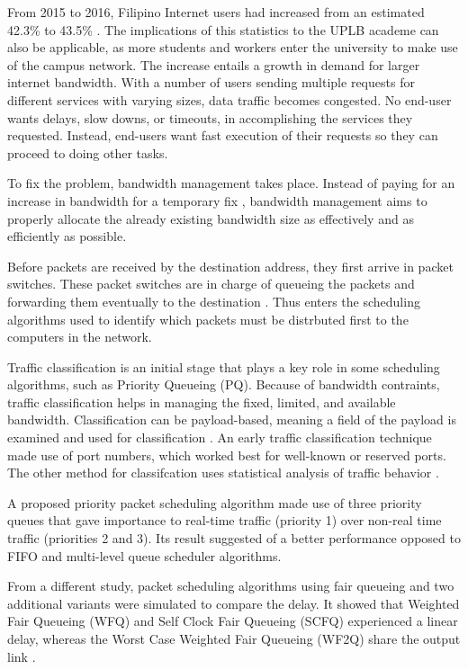 \documentclass[journal]{IEEE/IEEEtran}
\begin{document}
From 2015 to 2016, Filipino Internet users had increased from an estimated 42.3\% to 43.5\% \cite{internet_live_stats_2016}. The implications of this statistics to the UPLB academe can also be applicable, as more students and workers enter the university to make use of the campus network. The increase entails a growth in demand for larger internet bandwidth. With a number of users sending multiple requests for different services with varying sizes, data traffic becomes congested. No end-user wants delays, slow downs, or timeouts, in accomplishing the services they requested. Instead, end-users want fast execution of their requests so they can proceed to doing other tasks.

To fix the problem, bandwidth management takes place. Instead of paying for an increase in bandwidth for a temporary fix \cite{communication_news_2001}, bandwidth management aims to properly allocate the already existing bandwidth size as effectively and as efficiently as possible.

Before packets are received by the destination address, they first arrive in packet switches. These packet switches are in charge of queueing the packets and forwarding them eventually to the destination \cite{comer_1999}. Thus enters the scheduling algorithms used to identify which packets must be distrbuted first to the computers in the network.

Traffic classification is an initial stage that plays a key role in some scheduling algorithms, such as Priority Queueing (PQ). Because of bandwidth contraints, traffic classification helps in managing the fixed, limited, and available bandwidth. Classification can be payload-based, meaning a field of the payload is examined and used for classification \cite[Chapter~5]{cisco_2008}. An early traffic classification technique \cite{schneider_1996} made use of port numbers, which worked best for well-known or reserved ports. The other method for classifcation uses statistical analysis of traffic behavior \cite[Chapter~5]{cisco_2008}.

A proposed priority packet scheduling algorithm \cite{karim_2012} made use of three priority queues that gave importance to real-time traffic (priority 1) over non-real time traffic (priorities 2 and 3). Its result suggested of a better performance opposed to FIFO and multi-level queue scheduler algorithms.

From a different study, packet scheduling algorithms using fair queueing and two additional variants were simulated to compare the delay. It showed that Weighted Fair Queueing (WFQ) and Self Clock Fair Queueing (SCFQ) experienced a linear delay, whereas the Worst Case Weighted Fair Queueing (WF2Q) share the output link \cite{muhilan_2013}.
\end{document}
